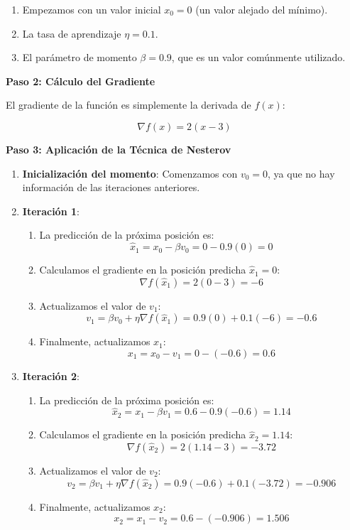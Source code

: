\documentclass{article}
\begin{document}
	\begin{enumerate}
		\item Empezamos con un valor inicial \( x_0 = 0 \) (un valor alejado del mínimo).
		\item La tasa de aprendizaje \( \eta = 0.1 \).
		\item El parámetro de momento \( \beta = 0.9 \), que es un valor comúnmente utilizado.
	\end{enumerate}
	
	\textbf{Paso 2: Cálculo del Gradiente}
	
	El gradiente de la función es simplemente la derivada de \( f(x) \):
	
	\[
	\nabla f(x) = 2(x - 3)
	\]
	
	\textbf{Paso 3: Aplicación de la Técnica de Nesterov}
	
	\begin{enumerate}
		\item \textbf{Inicialización del momento}: Comenzamos con \( v_0 = 0 \), ya que no hay información de las iteraciones anteriores.
		\item \textbf{Iteración 1}:
		\begin{enumerate}
			\item La predicción de la próxima posición es: 
			\[
			\hat{x}_1 = x_0 - \beta v_0 = 0 - 0.9(0) = 0
			\]
			\item Calculamos el gradiente en la posición predicha \( \hat{x}_1 = 0 \):
			\[
			\nabla f(\hat{x}_1) = 2(0 - 3) = -6
			\]
			\item Actualizamos el valor de \( v_1 \):
			\[
			v_1 = \beta v_0 + \eta \nabla f(\hat{x}_1) = 0.9(0) + 0.1(-6) = -0.6
			\]
			\item Finalmente, actualizamos \( x_1 \):
			\[
			x_1 = x_0 - v_1 = 0 - (-0.6) = 0.6
			\]
		\end{enumerate}
		\item \textbf{Iteración 2}:
		\begin{enumerate}
			\item La predicción de la próxima posición es:
			\[
			\hat{x}_2 = x_1 - \beta v_1 = 0.6 - 0.9(-0.6) = 1.14
			\]
			\item Calculamos el gradiente en la posición predicha \( \hat{x}_2 = 1.14 \):
			\[
			\nabla f(\hat{x}_2) = 2(1.14 - 3) = -3.72
			\]
			\item Actualizamos el valor de \( v_2 \):
			\[
			v_2 = \beta v_1 + \eta \nabla f(\hat{x}_2) = 0.9(-0.6) + 0.1(-3.72) = -0.906
			\]
			\item Finalmente, actualizamos \( x_2 \):
			\[
			x_2 = x_1 - v_2 = 0.6 - (-0.906) = 1.506
			\]
		\end{enumerate}
	\end{enumerate}
	
\end{document}
